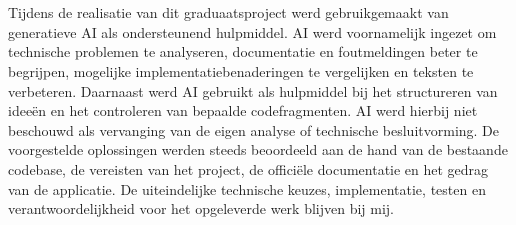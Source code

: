 \chapter{}%
\label{ch:ai}
Tijdens de realisatie van dit graduaatsproject werd gebruikgemaakt van generatieve AI als ondersteunend hulpmiddel. AI werd voornamelijk ingezet om technische problemen te analyseren, documentatie en foutmeldingen beter te begrijpen, mogelijke implementatiebenaderingen te vergelijken en teksten te verbeteren. Daarnaast werd AI gebruikt als hulpmiddel bij het structureren van ideeën en het controleren van bepaalde codefragmenten.
AI werd hierbij niet beschouwd als vervanging van de eigen analyse of technische besluitvorming. De voorgestelde oplossingen werden steeds beoordeeld aan de hand van de bestaande codebase, de vereisten van het project, de officiële documentatie en het gedrag van de applicatie. De uiteindelijke technische keuzes, implementatie, testen en verantwoordelijkheid voor het opgeleverde werk blijven bij mij.

